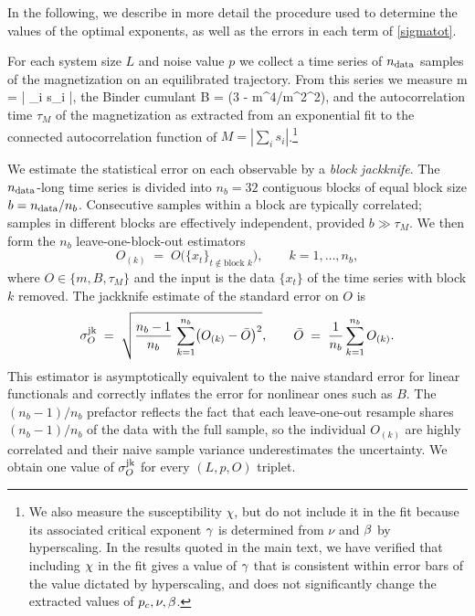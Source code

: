 \documentclass[pra,aps,twocolumn,groupedaddress,superscriptaddress,nofootinbib,preprintnumbers]{revtex4-2}
\begin{document}
\begin{widetext}
		In the following, we 
		describe in more detail the procedure used to determine the values of the optimal exponents, as well as the errors in each term of \eqref{sigmatot}. 
		
		\label{sec:jackknife}
		
		For each system size $L$ and noise value $p$ we collect a time series
		of $n_{\rm data}$ samples of the magnetization on an
		equilibrated trajectory. From this series we measure 
		\be m = \left \langle \left |  \sum_i s_i \right|\right\ran,\ee
		the Binder cumulant
		\be B = (3 - \langle m^4\rangle/\langle m^2\rangle^2),\ee 
		and
		the autocorrelation time $\tau_M$ of the magnetization as extracted from an
		exponential fit to the connected autocorrelation function of $M = |\sum_i s_i|$.\footnote{We also measure the susceptibility $\chi$, but do not include it in the fit because its associated critical exponent $\gamma$ is determined from $\nu$ and $\beta$ by hyperscaling. In the results quoted in the main text, we have verified that including $\chi$ in the fit gives a value of $\gamma$ that is consistent within error bars of the value dictated by hyperscaling, and does not significantly change the extracted values of $p_c,\nu,\beta$.}
		
		We estimate the statistical error on each observable by a
		\emph{block jackknife}. The $n_{\rm data}$-long time series is divided
		into $n_b = 32$ contiguous blocks of equal block size
		$b = n_{\rm data}/n_b$. Consecutive samples within a block are
		typically correlated; samples in different blocks are effectively
		independent, provided $b \gg \tau_M$. We then form the $n_b$
		leave-one-block-out estimators
		\begin{equation}
			O_{(k)} \;=\; O\bigl(\{x_t\}_{t \notin \text{block }k}\bigr),
			\qquad k = 1,\dots,n_b,
		\end{equation}
		where $O \in \{ m,B,\tau_M\}$ and the input is the data $\{x _t\}$ of the time series with block $k$
		removed. The jackknife estimate of the standard error on $O$ is
		\begin{equation}
			\sigma_O^{\rm jk}
			\;=\;
			\sqrt{
				\frac{n_b - 1}{n_b}\,
				\sum_{k=1}^{n_b}\bigl(O_{(k)} - \bar{O}\bigr)^2
			},
			\qquad
			\bar{O} \;=\; \frac{1}{n_b}\sum_{k=1}^{n_b}O_{(k)}.
			\label{eq:jk-sigma}
		\end{equation}
		This estimator is asymptotically equivalent to the naive standard
		error for linear functionals and correctly inflates the error for
		nonlinear ones such as $B$. The $(n_b{-}1)/n_b$ prefactor
		reflects the fact that each leave-one-out resample shares $(n_b{-}1)/n_b$
		of the data with the full sample, so the individual $O_{(k)}$ are
		highly correlated and their naive sample variance underestimates the
		uncertainty. We obtain one value of $\sigma_O^{\rm jk}$ for every
		$(L, p, O)$ triplet.
		

\end{widetext}
\end{document}
